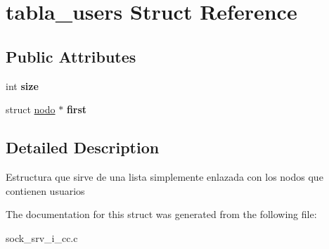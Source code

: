 \hypertarget{structtabla__users}{\section{tabla\-\_\-users Struct Reference}
\label{structtabla__users}
}
\subsection*{Public Attributes}
\begin{DoxyCompactItemize}
\item 
\hypertarget{structtabla__users_aab67aa123d04ad716f22185ca0325798}{int {\bfseries size}}\label{structtabla__users_aab67aa123d04ad716f22185ca0325798}

\item 
\hypertarget{structtabla__users_a2c26d66aa58de886855e23806e89261a}{struct \hyperlink{structnodo}{nodo} $\ast$ {\bfseries first}}\label{structtabla__users_a2c26d66aa58de886855e23806e89261a}

\end{DoxyCompactItemize}


\subsection{Detailed Description}
Estructura que sirve de una lista simplemente enlazada con los nodos que contienen usuarios 

The documentation for this struct was generated from the following file\-:\begin{DoxyCompactItemize}
\item 
sock\-\_\-srv\-\_\-i\-\_\-cc.\-c\end{DoxyCompactItemize}
